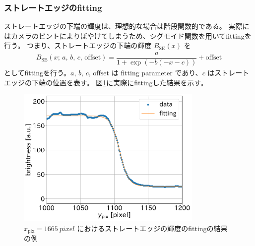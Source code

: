 \documentclass[../../main.tex]{subfiles}
\begin{document}
\subsubsection{ストレートエッジのfitting}
ストレートエッジの下端の輝度は、理想的な場合は階段関数的である。
実際にはカメラのピントによりぼやけてしまうため、シグモイド関数を用いてfittingを行う。
つまり、ストレートエッジの下端の輝度 $B_{\mathrm{SE}}(x)$ を
\begin{align}
    B_{\mathrm{SE}}(x;\,a,\,b,\,c,\,\text{offset}) = \dfrac{a}{1+\exp(-b(-x-c))} + \mathrm{offset}
\end{align}
としてfittingを行う。$a,\,b,\,c,\,\text{offset}$ は fitting parameter であり、$c$ はストレートエッジの下端の位置を表す。
図\ref{fig:wiresag_edge_fit}に実際にfittingした結果を示す。
\begin{figure}[H]
    \centering
    \includegraphics[width=0.8\textwidth]{wiresag/wiresag_straight_edge_fit.pdf}
    \caption{$x_{\mathrm{pix}}=\SI{1665}{pixel}$ におけるストレートエッジの輝度のfittingの結果の例}
    \label{fig:wiresag_edge_fit}
\end{figure}
\end{document}
